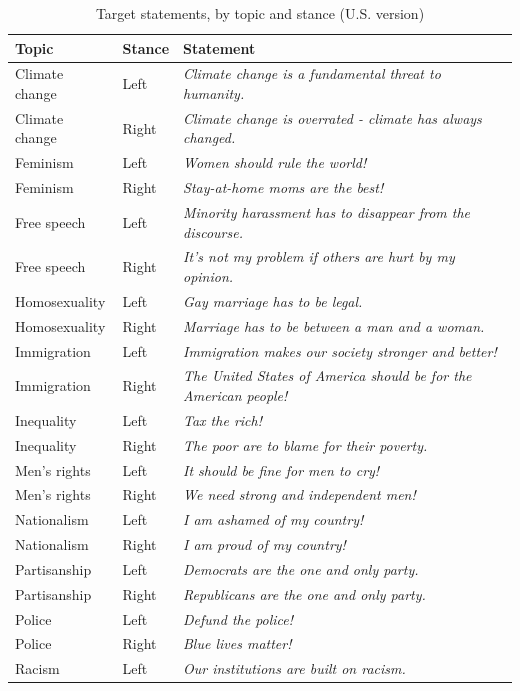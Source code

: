 \begin{table}[H]
\centering
\caption{\label{tab:target-messages}Target statements, by topic and stance (U.S. version)}
\centering
\begin{tabular}[t]{lll}
\toprule
\textbf{Topic} & \textbf{Stance} & \textbf{Statement}\\
\midrule
Climate change & Left & \emph{Climate change is a fundamental threat to humanity.}\\
Climate change & Right & \emph{Climate change is overrated - climate has always changed.}\\
Feminism & Left & \emph{Women should rule the world!}\\
Feminism & Right & \emph{Stay-at-home moms are the best!}\\
Free speech & Left & \emph{Minority harassment has to disappear from the discourse.}\\
Free speech & Right & \emph{It's not my problem if others are hurt by my opinion.}\\
Homosexuality & Left & \emph{Gay marriage has to be legal.}\\
Homosexuality & Right & \emph{Marriage has to be between a man and a woman.}\\
Immigration & Left & \emph{Immigration makes our society stronger and better!}\\
Immigration & Right & \emph{The United States of America should be for the American people!}\\
Inequality & Left & \emph{Tax the rich!}\\
Inequality & Right & \emph{The poor are to blame for their poverty.}\\
Men's rights & Left & \emph{It should be fine for men to cry!}\\
Men's rights & Right & \emph{We need strong and independent men!}\\
Nationalism & Left & \emph{I am ashamed of my country!}\\
Nationalism & Right & \emph{I am proud of my country!}\\
Partisanship & Left & \emph{Democrats are the one and only party.}\\
Partisanship & Right & \emph{Republicans are the one and only party.}\\
Police & Left & \emph{Defund the police!}\\
Police & Right & \emph{Blue lives matter!}\\
Racism & Left & \emph{Our institutions are built on racism.}\\

\end{tabular}
\end{table}
